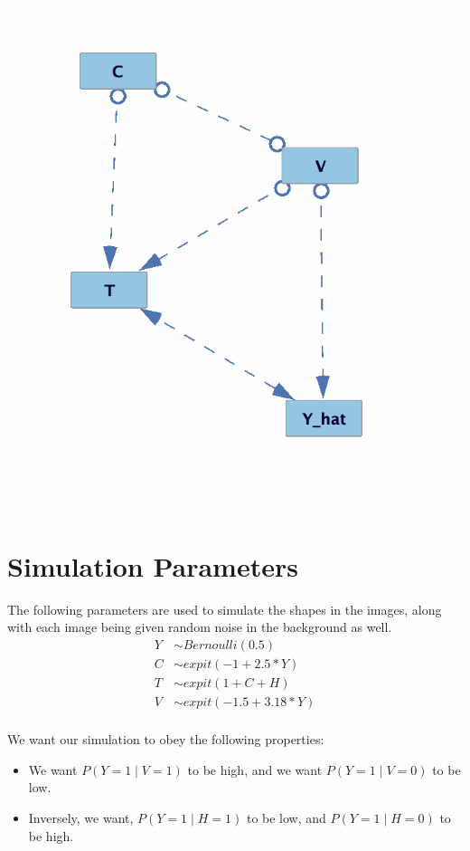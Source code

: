 \documentclass{article}
\begin{document}
\begin{center}
\includegraphics[scale=0.4]{FCI_output_true_dgp.png}
\end{center}

\section{Simulation Parameters}

The following parameters are used to simulate the shapes in the images, along with each image being given random noise in the background as well.
\begin{align*}
Y &\sim Bernoulli(0.5)\\
C & \sim expit(-1 + 2.5*Y)\\
T &\sim expit(1 + C+ H)\\
V &\sim expit(-1.5 + 3.18*Y)\\
\end{align*}

We want our simulation to obey the following properties:
\begin{itemize}
\item  We want $P(Y = 1 \mid V = 1)$ to be high, and we want $P(Y = 1 \mid V = 0)$ to be low. 
\item Inversely, we want, $P(Y = 1 \mid H = 1)$ to be low, and $P(Y = 1 \mid H = 0)$ to be high. 
\end{itemize}
\end{document}
